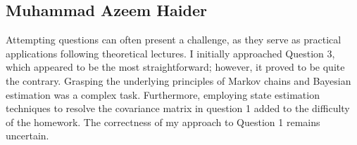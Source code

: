 \documentclass[answers]{exam}
\begin{document}
\begin{questions}
\begin{parts}
\begin{solution}
            \subsection*{Muhammad Azeem Haider}
            Attempting questions can often present a challenge, as they serve as practical
            applications following theoretical lectures. I initially approached Question 3,
            which appeared to be the most straightforward; however, it proved to be quite
            the contrary. Grasping the underlying principles of Markov chains and Bayesian
            estimation was a complex task. Furthermore, employing state estimation
            techniques to resolve the covariance matrix in question 1 added to the
            difficulty of the homework. The correctness of my approach to Question 1
            remains uncertain.

        \end{solution}
    \end{parts}
\end{questions}
\end{document}
